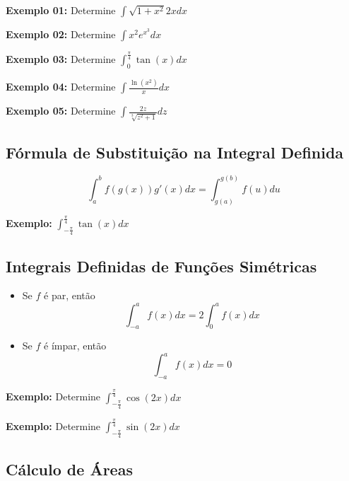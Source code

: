 \documentclass[oneside,a4paper,12pt]{article}
\begin{document}
{\bf Exemplo 01:} Determine $\int \sqrt{1 + x^2}2x dx$

\vspace{300pt}

{\bf Exemplo 02:} Determine $\int x^2 e^{x^3}dx$

\vspace{300pt}

{\bf Exemplo 03:} Determine $\int_{0}^{\frac{\pi}{4}}\tan(x)dx$
\newpage

{\bf Exemplo 04:} Determine $\int \frac{\ln(x^2)}{x}dx$

\vspace{300pt}

{\bf Exemplo 05:} Determine $\int \frac{2z}{\sqrt[3]{z^2 + 1}}dz$

\vspace{300pt}

\subsection{Fórmula de Substituição na Integral Definida}

$$\int_{a}^{b}f(g(x))g'(x)dx = \int_{g(a)}^{g(b)}f(u)du$$
\vspace{100pt}

{\bf Exemplo: } $\int_{-\frac{\pi}{4}}^{\frac{\pi}{4}}\tan(x)dx$
\newpage

\subsection{Integrais Definidas de Funções Simétricas}

\begin{itemize}
	\item Se $f$ é par, então
	$$\int_{-a}^{a}f(x)dx = 2\int_{0}^{a}f(x)dx$$
	\item Se $f$ é ímpar, então
	$$\int_{-a}^{a}f(x)dx = 0$$
\end{itemize}

{\bf Exemplo:} Determine $\int_{-\frac{\pi}{4}}^{\frac{\pi}{4}}\cos(2x)dx$

\vspace{300pt}

{\bf Exemplo:} Determine $\int_{-\frac{\pi}{4}}^{\frac{\pi}{4}}\sin(2x)dx$

\vspace{100pt}

\subsection{Cálculo de Áreas}
\end{document}
